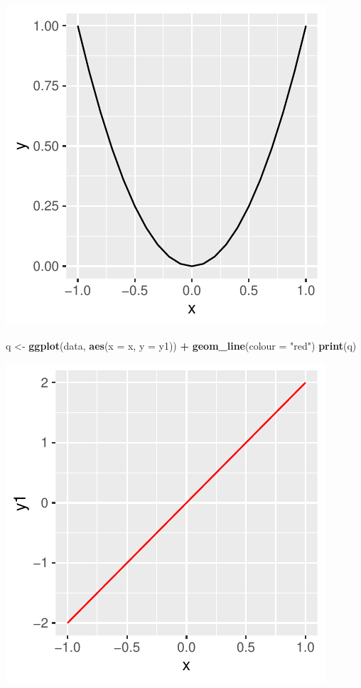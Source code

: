 \documentclass[]{book}
\newenvironment{Shaded}{\begin{snugshade}}{\end{snugshade}}
\newcommand{\DataTypeTok}[1]{\textcolor[rgb]{0.13,0.29,0.53}{#1}}
\newcommand{\KeywordTok}[1]{\textcolor[rgb]{0.13,0.29,0.53}{\textbf{#1}}}
\newcommand{\NormalTok}[1]{#1}
\newcommand{\OperatorTok}[1]{\textcolor[rgb]{0.81,0.36,0.00}{\textbf{#1}}}
\newcommand{\StringTok}[1]{\textcolor[rgb]{0.31,0.60,0.02}{#1}}
\begin{document}
\includegraphics{bookdown-demo_files/figure-latex/unnamed-chunk-10-1.pdf}

\begin{Shaded}
\begin{Highlighting}[]
\NormalTok{q <-}\StringTok{ }\KeywordTok{ggplot}\NormalTok{(data, }\KeywordTok{aes}\NormalTok{(}\DataTypeTok{x =}\NormalTok{ x, }\DataTypeTok{y =}\NormalTok{ y1)) }\OperatorTok{+}
\StringTok{  }\KeywordTok{geom_line}\NormalTok{(}\DataTypeTok{colour =} \StringTok{"red"}\NormalTok{)}
\KeywordTok{print}\NormalTok{(q)}
\end{Highlighting}
\end{Shaded}

\includegraphics{bookdown-demo_files/figure-latex/unnamed-chunk-10-2.pdf}
\end{document}
